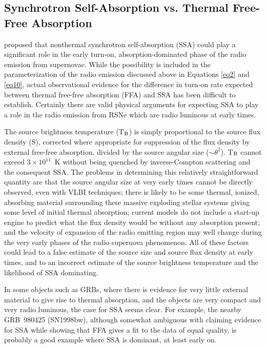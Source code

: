 \documentclass[12pt,preprint]{aastex}
\begin{document}
\subsection{Synchrotron Self-Absorption vs. Thermal Free-Free
Absorption}

\citet{Chevalier98} proposed that nonthermal synchrotron self-absorption
(SSA) could play a significant role in the early turn-on, absorption-dominated phase of the radio emission from supernovae.  While the
possibility is included in the parameterization of the radio emission
discussed above in Equations \ref{eq2} and \ref{eq10}, actual
observational evidence for the difference in turn-on rate expected
between thermal free-free absorption (FFA) and SSA has been difficult to
establish.  Certainly there are valid physical arguments for expecting
SSA to play a role in the radio emission from RSNe which are radio
luminous at early times.

The source brightness temperature (T$_{\rm B}$) is simply proportional to the source flux density (S), corrected where appropriate for suppression of the flux density by external free-free absorption, divided by the source angular size ($\sim\theta^2$).  T$_{\rm B}$ cannot exceed $3 \times 10^{11}$~K \citep{Kellermann69,Readhead94} without being quenched by inverse-Compton scattering and the consequent SSA. The problems in
determining this relatively straightforward quantity are that the source angular size at very early times cannot be directly observed, even with VLBI techniques; there is likely to be some thermal, ionized, absorbing material surrounding these massive exploding stellar systems giving some
level of initial thermal absorption; current models do not include a start-up engine to predict what the flux density would be without any absorption present; and the velocity of expansion of the radio emitting region may well change during the very early phases of the radio supernova phenomenon. All of these factors could lead to a false estimate of the source size and source flux density at early times, and to an incorrect estimate of the source brightness temperature and the likelihood of SSA dominating.

In some objects such as GRBs, where there is evidence for very little external material to give rise to thermal absorption, and the objects are very compact and very radio luminous, the case for SSA seems clear. For example, the nearby GRB~980425 (SN1998bw), although somewhat ambiguous with \citet{Kulkarni98} claiming evidence for SSA while \citet{Weiler01} showing that FFA gives a fit to the data of equal quality, is probably a good example where SSA is dominant, at least early on.
\end{document}
